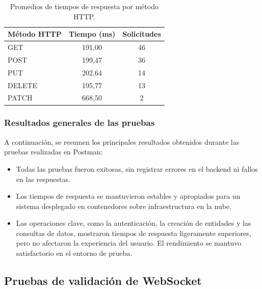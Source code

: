 \begin{table}[H]
    \centering
    \caption[Promedios de tiempos de respuesta]{Promedios de tiempos de respuesta por método HTTP.}
    \begin{tabular}{ l c c }
        \toprule
        \textbf{Método HTTP} & \textbf{Tiempo (ms)} & \textbf{Solicitudes} \\
        \midrule
        GET                  & 191,00               & 46                   \\
        POST                 & 199,47               & 36                   \\
        PUT                  & 202,64               & 14                   \\
        DELETE               & 195,77               & 13                   \\
        PATCH                & 668,50               & 2                    \\
        \bottomrule
    \end{tabular}
    \label{tab:promedios_metodo_http}
\end{table}

\subsubsection{Resultados generales de las pruebas}

A continuación, se resumen los principales resultados obtenidos durante las
pruebas realizadas en Postman:

\begin{itemize}
    \item Todas las pruebas fueron exitosas, sin registrar errores en el backend ni
          fallos en las respuestas.
    \item Los tiempos de respuesta se mantuvieron estables y apropiados para un sistema
          desplegado en contenedores sobre infraestructura en la nube.
    \item Las operaciones clave, como la autenticación, la creación de entidades y las
          consultas de datos, mostraron tiempos de respuesta ligeramente superiores, pero
          no afectaron la experiencia del usuario. El rendimiento se mantuvo
          satisfactorio en el entorno de prueba.
\end{itemize}

\subsection{Pruebas de validación de WebSocket}

